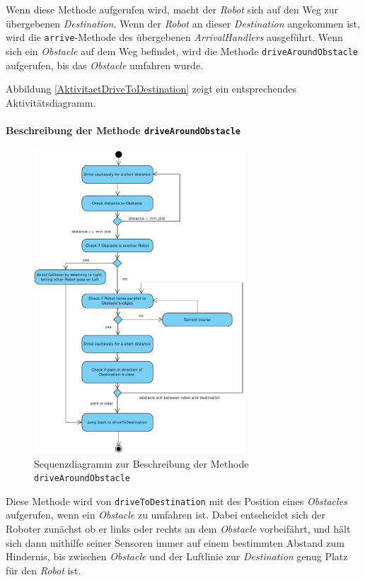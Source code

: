 			Wenn diese Methode aufgerufen wird, macht der \textit{Robot} sich auf den Weg zur 
			übergebenen \textit{Destination}. Wenn der \textit{Robot} an dieser \textit{Destination} 
			angekommen ist, wird die \texttt{arrive}-Methode des übergebenen \textit{ArrivalHandlers} ausgeführt. 
			Wenn sich ein \textit{Obstacle} auf dem Weg befindet, wird die Methode \texttt{driveAroundObstacle} 
			aufgerufen, bis das \textit{Obstacle} umfahren wurde.
			
			Abbildung \ref{AktivitaetDriveToDestination} zeigt ein entsprechendes Aktivitätsdiagramm.

			\paragraph{Beschreibung der Methode \texttt{driveAroundObstacle}}
			\begin{figure}[H]
			\centering
			\includegraphics[width=0.7\textwidth]{img/1-Entwurf-7-driveAroundObstacle}
			\caption{Sequenzdiagramm zur Beschreibung der Methode \texttt{driveAroundObstacle}}
			\label{SequenzDriveAroundObstacle}
			\end{figure}

			Diese Methode wird von \texttt{driveToDestination} mit des Position eines \textit{Obstacles} aufgerufen, 
			wenn ein \textit{Obstacle} zu umfahren ist.
			Dabei entscheidet sich der Roboter zunächst ob er links oder rechts an dem \textit{Obstacle} vorbeifährt, 
			und hält sich dann mithilfe seiner Sensoren immer auf einem bestimmten Abstand zum Hindernis, bis zwischen 
			\textit{Obstacle} und der Luftlinie zur \textit{Destination} genug Platz für den \textit{Robot} ist.
			
